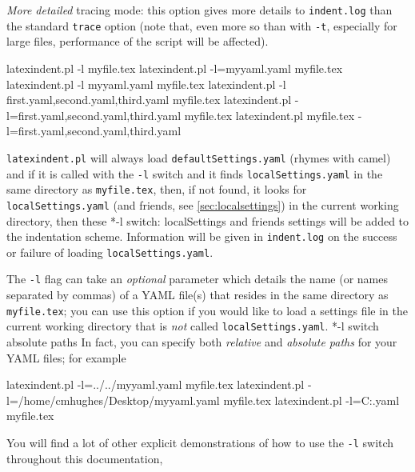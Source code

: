  \emph{More detailed} tracing mode: this option gives more details to
 \texttt{indent.log}
 than the standard \texttt{trace} option (note that, even more so than with \texttt{-t},
 especially for large files, performance of the script will be affected).


 \begin{commandshell}
latexindent.pl -l myfile.tex
latexindent.pl -l=myyaml.yaml myfile.tex
latexindent.pl -l myyaml.yaml myfile.tex
latexindent.pl -l first.yaml,second.yaml,third.yaml myfile.tex
latexindent.pl -l=first.yaml,second.yaml,third.yaml myfile.tex
latexindent.pl myfile.tex -l=first.yaml,second.yaml,third.yaml 
\end{commandshell}

 \label{page:localswitch}
 \texttt{latexindent.pl} will always load \texttt{defaultSettings.yaml} (rhymes with
 camel) and if it is called with the \texttt{-l} switch and it finds
 \texttt{localSettings.yaml} in the same directory as \texttt{myfile.tex}, then, if not
 found, it looks for \texttt{localSettings.yaml} (and friends, see
 \vref{sec:localsettings}) in the current working directory, then
 these%
 *{-l switch: localSettings and
 friends} settings will be added to the indentation scheme. Information will be given in
 \texttt{indent.log} on the success or failure of loading \texttt{localSettings.yaml}.

 The \texttt{-l} flag can take an \emph{optional} parameter which details the name (or
 names separated by commas) of a YAML file(s) that resides in the same directory as
 \texttt{myfile.tex}; you can use this option if you would like to load a settings file
 in the current working directory that is \emph{not} called \texttt{localSettings.yaml}.
 *{-l switch absolute paths} In fact, you can specify both
 \emph{relative} and \emph{absolute paths} for your YAML files; for example%

 \begin{commandshell}
latexindent.pl -l=../../myyaml.yaml myfile.tex
latexindent.pl -l=/home/cmhughes/Desktop/myyaml.yaml myfile.tex
latexindent.pl -l=C:\Users\cmhughes\Desktop\myyaml.yaml myfile.tex
\end{commandshell}

 You will find a lot of other explicit demonstrations of how to use the \texttt{-l}
 switch throughout this documentation,

